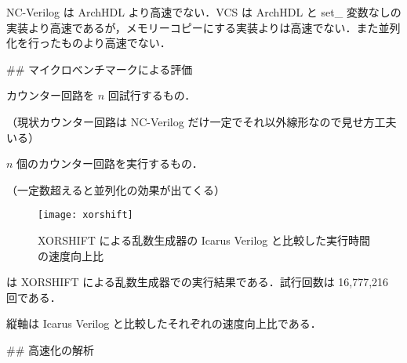NC-Verilog は ArchHDL より高速でない．VCS は ArchHDL と set_ 変数なしの実装より高速であるが，メモリーコピーにする実装よりは高速でない．また並列化を行ったものより高速でない．


## マイクロベンチマークによる評価

カウンター回路を $n$ 回試行するもの．

（現状カウンター回路は NC-Verilog だけ一定でそれ以外線形なので見せ方工夫いる）

$n$ 個のカウンター回路を実行するもの．

（一定数超えると並列化の効果が出てくる）


\begin{figure}[t]
 \centering
 \texttt{[image: xorshift]}
 \caption{XORSHIFT による乱数生成器の Icarus Verilog と比較した実行時間の速度向上比}
 \label{fig:xorshift}
\end{figure}

 は XORSHIFT による乱数生成器での実行結果である．試行回数は 16,777,216 回である．

縦軸は Icarus Verilog と比較したそれぞれの速度向上比である．









## 高速化の解析







